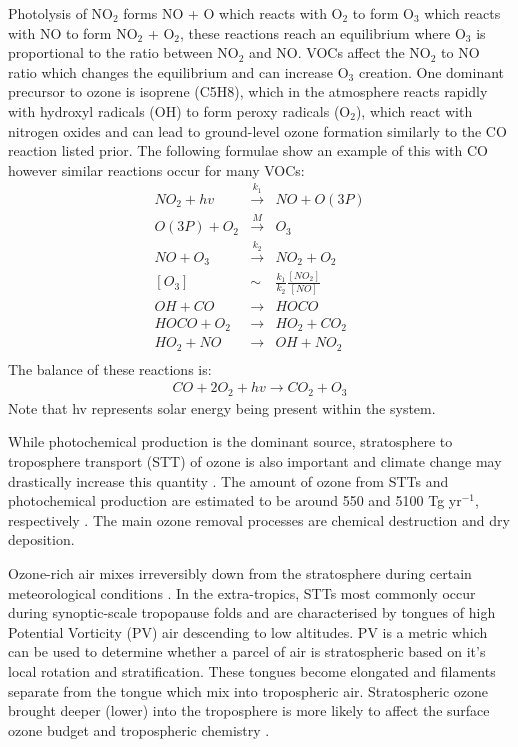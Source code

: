 Photolysis of NO$_2$ forms NO + O which reacts with O$_2$ to form O$_3$ which reacts with NO to form NO$_2$ + O$_2$, these reactions reach an equilibrium where O$_3$ is proportional to the ratio between NO$_2$ and NO.
VOCs affect the NO$_2$ to NO ratio which changes the equilibrium and can increase O$_3$ creation. 
One dominant precursor to ozone is isoprene (C5H8), which in the atmosphere reacts rapidly with hydroxyl radicals (OH) to form peroxy radicals (O$_2$), which react with nitrogen oxides and can lead to ground-level ozone formation similarly to the CO reaction listed prior.
The following formulae show an example of this with CO however similar reactions occur for many VOCs:
\begin{eqnarray*}
NO_2 + hv &\overset{k_1}{\rightarrow}& NO + O(3P) \\
O(3P) + O_2 &\overset{M}{\rightarrow}& O_3 \\
NO + O_3 &\overset{k_2}{\rightarrow}& NO_2 + O_2 \\
\left[O_3\right] &\sim& \frac{k_1}{k_2} \frac{\left[NO_2\right]}{\left[NO\right]} \\
OH + CO &{\rightarrow}& HOCO \\
HOCO + O_2 &{\rightarrow}& HO_2 + CO_2 \\
HO_2 + NO &{\rightarrow}& OH + NO_2 \\
\end{eqnarray*}
The balance of these reactions is:
\begin{eqnarray*} CO + 2O_2 + hv {\rightarrow} CO_2 + O_3 \end{eqnarray*}
Note that hv represents solar energy being present within the system.

While photochemical production is the dominant source, stratosphere to troposphere transport (STT) of ozone is also important and climate change may drastically increase this quantity \cite{Hegglin_2009}.
The amount of ozone from STTs and photochemical production are estimated to be around 550 and 5100 Tg yr$^{-1}$, respectively \cite{Stevenson_2006}. 
The main ozone removal processes are chemical destruction and dry deposition.

Ozone-rich air mixes irreversibly down from the stratosphere during certain meteorological conditions \citep{Sprenger2003,Mihalikova2012}.
In the extra-tropics, STTs most commonly occur during synoptic-scale tropopause folds \citep{Sprenger2003} and are characterised by tongues of high Potential Vorticity (PV) air descending to low altitudes.
PV is a metric which can be used to determine whether a parcel of air is stratospheric based on it's local rotation and stratification.
These tongues become elongated and filaments separate from the tongue which mix into tropospheric air.
Stratospheric ozone brought deeper (lower) into the troposphere is more likely to affect the surface ozone budget and tropospheric chemistry \citep{Zanis2003,Langford_2009}.

  